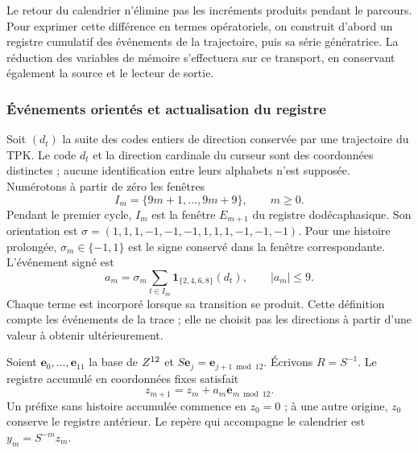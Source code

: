 Le retour du calendrier n'élimine pas les incréments produits pendant
le parcours. Pour exprimer cette différence en termes opératoriels, on construit
d'abord un registre cumulatif des événements de la trajectoire, puis sa
série génératrice. La réduction des variables de mémoire s'effectuera sur
ce transport, en conservant également la source et le lecteur de sortie.

\subsubsection{Événements orientés et actualisation du registre}

Soit \((d_t)\) la suite des codes entiers de direction conservée
par une trajectoire du TPK. Le code \(d_t\) et la direction cardinale
du curseur sont des coordonnées distinctes ; aucune identification
entre leurs alphabets n'est supposée. Numérotons à partir de zéro les fenêtres
\[
 I_m=\{9m+1,\ldots,9m+9\},\qquad m\geq0.
\]
Pendant le premier cycle, \(I_m\) est la fenêtre \(E_{m+1}\) du registre
dodécaphasique. Son orientation est
\(\sigma=(1,1,1,-1,-1,-1,1,1,1,-1,-1,-1)\).
Pour une histoire prolongée, \(\sigma_m\in\{-1,1\}\) est le signe
conservé dans la fenêtre correspondante. L’événement signé est
\begin{equation}
 a_m=\sigma_m\sum_{t\in I_m}
       \mathbf1_{\{2,4,6,8\}}(d_t),\qquad |a_m|\leq9.
 \label{x_reciprocidad:mem:evento}
\end{equation}
Chaque terme est incorporé lorsque sa transition se produit. Cette définition
compte les événements de la trace ; elle ne choisit pas les directions à partir d'une valeur
à obtenir ultérieurement.

Soient \(\mathbf e_0,\ldots,\mathbf e_{11}\) la base de \(Z^{12}\)
et \(S\mathbf e_j=\mathbf e_{j+1\bmod12}\). Écrivons
\(R=S^{-1}\). Le registre accumulé en coordonnées fixes satisfait
\[
z_{m+1}=z_m+a_m\mathbf e_{m\bmod12}.
\]
Un préfixe sans histoire accumulée commence en \(z_0=0\) ; à une autre
origine, \(z_0\) conserve le registre antérieur.
Le repère qui accompagne le calendrier est \(y_m=S^{-m}z_m\).

